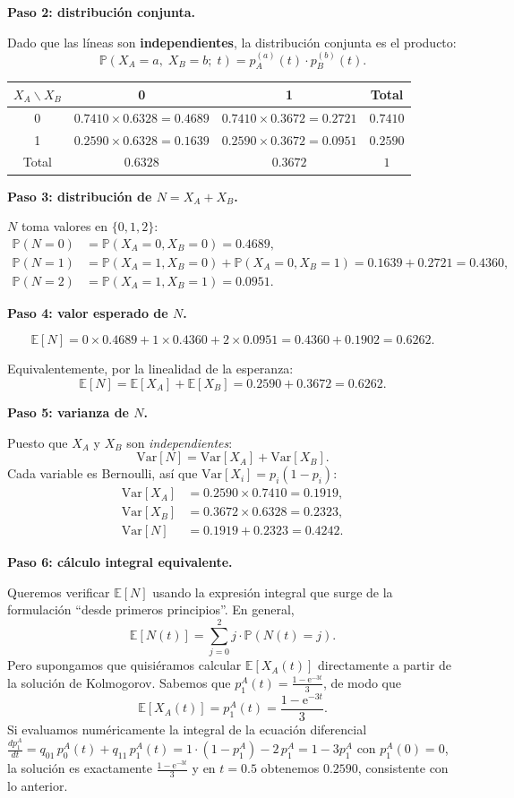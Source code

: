 \documentclass[11pt,a4paper]{article}
\theoremstyle{definition}
\theoremstyle{remark}
\newcommand{\E}{\mathbb{E}}
\newcommand{\Var}{\mathrm{Var}}
\newcommand{\Prob}{\mathbb{P}}
\newcommand{\e}{\mathrm{e}}
\begin{document}
\begin{ejemplo}
\textbf{Paso 2: distribución conjunta.}

Dado que las líneas son \textbf{independientes}, la distribución conjunta
es el producto:
\[
  \Prob(X_A=a,\;X_B=b;\;t) = p_A^{(a)}(t)\cdot p_B^{(b)}(t).
\]

\begin{center}
\begin{tabular}{c|cc|c}
\toprule
$X_A\backslash X_B$ & 0 & 1 & Total \\
\midrule
0 & $0.7410\times 0.6328 = 0.4689$ & $0.7410\times 0.3672 = 0.2721$ & $0.7410$ \\
1 & $0.2590\times 0.6328 = 0.1639$ & $0.2590\times 0.3672 = 0.0951$ & $0.2590$ \\
\midrule
Total & $0.6328$ & $0.3672$ & $1$ \\
\bottomrule
\end{tabular}
\end{center}

\textbf{Paso 3: distribución de $N = X_A + X_B$.}

$N$ toma valores en $\{0,1,2\}$:
\begin{align*}
  \Prob(N=0) &= \Prob(X_A=0,X_B=0) = 0.4689, \\
  \Prob(N=1) &= \Prob(X_A=1,X_B=0) + \Prob(X_A=0,X_B=1) = 0.1639+0.2721 = 0.4360, \\
  \Prob(N=2) &= \Prob(X_A=1,X_B=1) = 0.0951.
\end{align*}

\textbf{Paso 4: valor esperado de $N$.}

\[
  \E[N] = 0\times 0.4689 + 1\times 0.4360 + 2\times 0.0951
  = 0.4360 + 0.1902 = 0.6262.
\]

Equivalentemente, por la linealidad de la esperanza:
\[
  \E[N] = \E[X_A] + \E[X_B] = 0.2590 + 0.3672 = 0.6262.
\]

\textbf{Paso 5: varianza de $N$.}

Puesto que $X_A$ y $X_B$ son \emph{independientes}:
\[
  \Var[N] = \Var[X_A] + \Var[X_B].
\]
Cada variable es Bernoulli, así que $\Var[X_i] = p_i(1-p_i)$:
\begin{align*}
  \Var[X_A] &= 0.2590\times 0.7410 = 0.1919, \\
  \Var[X_B] &= 0.3672\times 0.6328 = 0.2323, \\
  \Var[N]   &= 0.1919 + 0.2323 = 0.4242.
\end{align*}

\textbf{Paso 6: cálculo integral equivalente.}

Queremos verificar $\E[N]$ usando la expresión integral que surge de
la formulación ``desde primeros principios''.  En general,
\[
  \E[N(t)] = \sum_{j=0}^{2} j\cdot\Prob(N(t)=j).
\]
Pero supongamos que quisiéramos calcular $\E[X_A(t)]$ directamente a
partir de la solución de Kolmogorov.  Sabemos que
$p_1^A(t) = \frac{1-\e^{-3t}}{3}$, de modo que
\[
  \E[X_A(t)] = p_1^A(t) = \frac{1-\e^{-3t}}{3}.
\]
Si evaluamos numéricamente la integral de la ecuación diferencial
$\frac{dp_1^A}{dt} = q_{01}\,p_0^A(t) + q_{11}\,p_1^A(t)
= 1\cdot(1-p_1^A)-2\,p_1^A = 1 - 3p_1^A$ con $p_1^A(0)=0$, la
solución es exactamente $\frac{1-\e^{-3t}}{3}$ y en $t=0.5$ obtenemos
$0.2590$, consistente con lo anterior.


\end{ejemplo}
\end{document}
